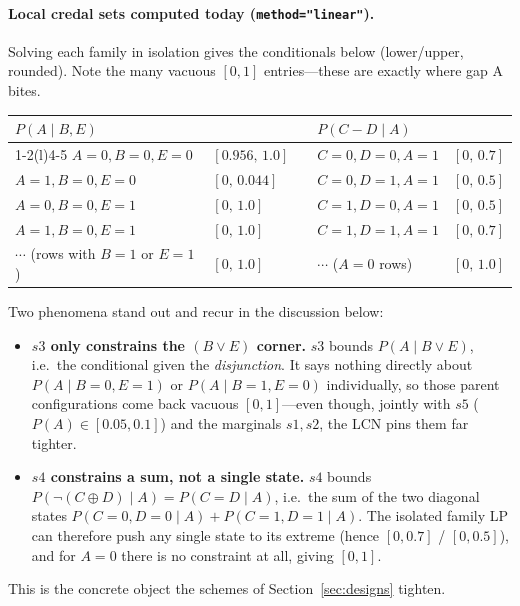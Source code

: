 \documentclass[11pt]{article}
\begin{document}
\paragraph{Local credal sets computed today (\texttt{method="linear"}).}
Solving each family in isolation gives the conditionals below (lower/upper, rounded). Note
the many vacuous $[0,1]$ entries---these are exactly where gap A bites.
\begin{center}
\begin{tabular}{llcll}
  \toprule
  \multicolumn{2}{l}{$P(A\mid B,E)$} & & \multicolumn{2}{l}{$P(C\!-\!D\mid A)$} \\
  \cmidrule(r){1-2}\cmidrule(l){4-5}
  $A{=}0,B{=}0,E{=}0$ & $[0.956,\,1.0]$   & & $C{=}0,D{=}0,A{=}1$ & $[0,\,0.7]$ \\
  $A{=}1,B{=}0,E{=}0$ & $[0,\,0.044]$     & & $C{=}0,D{=}1,A{=}1$ & $[0,\,0.5]$ \\
  $A{=}0,B{=}0,E{=}1$ & $[0,\,1.0]$       & & $C{=}1,D{=}0,A{=}1$ & $[0,\,0.5]$ \\
  $A{=}1,B{=}0,E{=}1$ & $[0,\,1.0]$       & & $C{=}1,D{=}1,A{=}1$ & $[0,\,0.7]$ \\
  $\cdots$ (rows with $B{=}1$ or $E{=}1$) & $[0,\,1.0]$ & & $\cdots$ ($A{=}0$ rows) & $[0,\,1.0]$ \\
  \bottomrule
\end{tabular}
\end{center}
Two phenomena stand out and recur in the discussion below:
\begin{itemize}
  \item \textbf{$s3$ only constrains the $(B\!\lor\!E)$ corner.} $s3$ bounds
    $P(A\mid B\lor E)$, i.e.\ the conditional given the \emph{disjunction}. It says nothing
    directly about $P(A\mid B{=}0,E{=}1)$ or $P(A\mid B{=}1,E{=}0)$ individually, so those
    parent configurations come back vacuous $[0,1]$---even though, jointly with $s5$
    ($P(A)\in[0.05,0.1]$) and the marginals $s1,s2$, the LCN pins them far tighter.
  \item \textbf{$s4$ constrains a sum, not a single state.} $s4$ bounds
    $P(\lnot(C\oplus D)\mid A){=}P(C{=}D\mid A)$, i.e.\ the sum of the two diagonal states
    $P(C{=}0,D{=}0\mid A)+P(C{=}1,D{=}1\mid A)$. The isolated family LP can therefore push
    any single state to its extreme (hence $[0,0.7]$ / $[0,0.5]$), and for $A{=}0$ there is
    no constraint at all, giving $[0,1]$.
\end{itemize}
This is the concrete object the schemes of Section~\ref{sec:designs} tighten.
\end{document}

